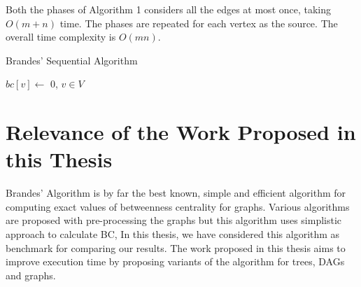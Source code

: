 Both the phases of Algorithm 1 considers all the edges at most once, taking $O(m + n)$ time. The phases are repeated for each vertex as the source. The overall time complexity is $O(mn)$.

\begin{algorithm}
\caption{Brandes' Sequential Algorithm}

$bc[v] \leftarrow$ 0, $v \in V$\;
\end{algorithm}
\vspace{-1.0em}
\section{Relevance of the Work Proposed in this Thesis}
Brandes' Algorithm is by far the best known, simple and efficient algorithm for computing exact values of betweenness centrality for graphs. Various algorithms are proposed with pre-processing the graphs but this algorithm uses simplistic approach to calculate BC, In this thesis, we have considered this algorithm as benchmark for comparing our results. 
The work proposed in this thesis aims to improve execution time by proposing variants of the algorithm for trees, DAGs and graphs.


